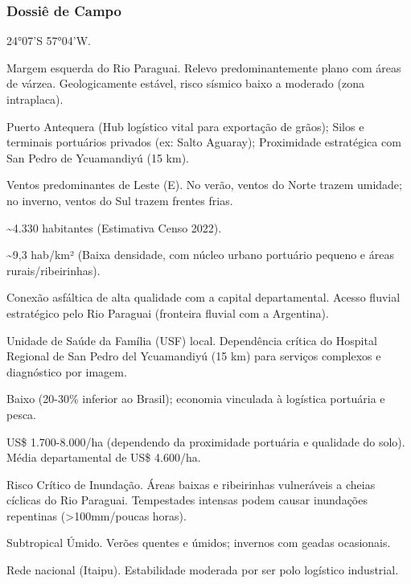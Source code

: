 \subsubsection{Dossiê de Campo}
\begin{description}[style=nextline,leftmargin=0.5cm,font=\bfseries]
\item[Coordenadas]  24°07'S 57°04'W.
\item[Topografia]  Margem esquerda do Rio Paraguai. Relevo predominantemente plano com áreas de várzea. Geologicamente estável, risco sísmico baixo a moderado (zona intraplaca).
\item[Alvos Estratégicos]  Puerto Antequera (Hub logístico vital para exportação de grãos); Silos e terminais portuários privados (ex: Salto Aguaray); Proximidade estratégica com San Pedro de Ycuamandiyú (15 km).
\item[Fallout]  Ventos predominantes de Leste (E). No verão, ventos do Norte trazem umidade; no inverno, ventos do Sul trazem frentes frias.
\item[População]  \textasciitilde 4.330 habitantes (Estimativa Censo 2022).
\item[Densidade]  \textasciitilde 9,3 hab/\allowbreak km² (Baixa densidade, com núcleo urbano portuário pequeno e áreas rurais/\allowbreak ribeirinhas).
\item[Vias de Acesso]  Conexão asfáltica de alta qualidade com a capital departamental. Acesso fluvial estratégico pelo Rio Paraguai (fronteira fluvial com a Argentina).
\item[Serviços]  Unidade de Saúde da Família (USF) local. Dependência crítica do Hospital Regional de San Pedro del Ycuamandiyú (15 km) para serviços complexos e diagnóstico por imagem.
\item[Custo de Vida]  Baixo (20-30\% inferior ao Brasil); economia vinculada à logística portuária e pesca.
\item[Preço da Terra]  US\$ 1.700-8.000/\allowbreak ha (dependendo da proximidade portuária e qualidade do solo). Média departamental de US\$ 4.600/\allowbreak ha.
\item[Hidrologia]  Risco Crítico de Inundação. Áreas baixas e ribeirinhas vulneráveis a cheias cíclicas do Rio Paraguai. Tempestades intensas podem causar inundações repentinas (>100mm/\allowbreak poucas horas).
\item[Clima]  Subtropical Úmido. Verões quentes e úmidos; invernos com geadas ocasionais.
\item[Energia]  Rede nacional (Itaipu). Estabilidade moderada por ser polo logístico industrial.

\end{description}

